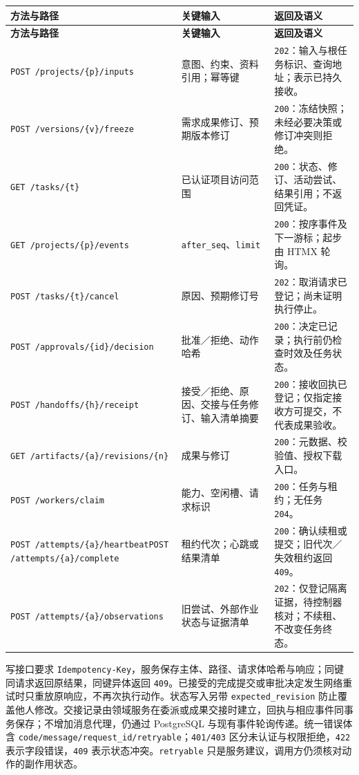 \documentclass[11pt,a4paper]{article}
\begin{document}
\begingroup\small
\begin{longtable}{P{5.2cm}P{3.3cm}P{6.2cm}}
\toprule\textbf{方法与路径} & \textbf{关键输入} & \textbf{返回及语义}\\\midrule\endfirsthead
\toprule\textbf{方法与路径} & \textbf{关键输入} & \textbf{返回及语义}\\\midrule\endhead
\texttt{POST /projects/\{p\}/inputs} & 意图、约束、资料引用；幂等键 & \texttt{202}：输入与根任务标识、查询地址；表示已持久接收。\\
\texttt{POST /versions/\{v\}/freeze} & 需求成果修订、预期版本修订 & \texttt{200}：冻结快照；未经必要决策或修订冲突则拒绝。\\
\texttt{GET /tasks/\{t\}} & 已认证项目访问范围 & \texttt{200}：状态、修订、活动尝试、结果引用；不返回凭证。\\
\texttt{GET /projects/\{p\}/events} & \texttt{after\_seq}、\texttt{limit} & \texttt{200}：按序事件及下一游标；起步由 HTMX 轮询。\\
\texttt{POST /tasks/\{t\}/cancel} & 原因、预期修订号 & \texttt{202}：取消请求已登记；尚未证明执行停止。\\
\texttt{POST /approvals/\{id\}/decision} & 批准／拒绝、动作哈希 & \texttt{200}：决定已记录；执行前仍检查时效及任务状态。\\
\texttt{POST /handoffs/\{h\}/receipt} & 接受／拒绝、原因、交接与任务修订、输入清单摘要 & \texttt{200}：接收回执已登记；仅指定接收方可提交，不代表成果验收。\\
\texttt{GET /artifacts/\{a\}/revisions/\{n\}} & 成果与修订 & \texttt{200}：元数据、校验值、授权下载入口。\\
\texttt{POST /workers/claim} & 能力、空闲槽、请求标识 & \texttt{200}：任务与租约；无任务 \texttt{204}。\\
\texttt{POST /attempts/\{a\}/heartbeat}\newline\texttt{POST /attempts/\{a\}/complete} & 租约代次；心跳或结果清单 & \texttt{200}：确认续租或提交；旧代次／失效租约返回 \texttt{409}。\\
\texttt{POST /attempts/\{a\}/observations} & 旧尝试、外部作业状态与证据清单 & \texttt{202}：仅登记隔离证据，待控制器核对；不续租、不改变任务终态。\\
\bottomrule
\end{longtable}
\endgroup

写接口要求 \texttt{Idempotency-Key}，服务保存主体、路径、请求体哈希与响应；同键同请求返回原结果，同键异体返回 \texttt{409}。已接受的完成提交或审批决定发生网络重试时只重放原响应，不再次执行动作。状态写入另带 \texttt{expected\_revision} 防止覆盖他人修改。交接记录由领域服务在委派或成果交接时建立，回执与相应事件同事务保存；不增加消息代理，仍通过 PostgreSQL 与现有事件轮询传递。统一错误体含 \texttt{code/message/request\_id/retryable}；\texttt{401/403} 区分未认证与权限拒绝，\texttt{422} 表示字段错误，\texttt{409} 表示状态冲突。\texttt{retryable} 只是服务建议，调用方仍须核对动作的副作用状态。
\end{document}

